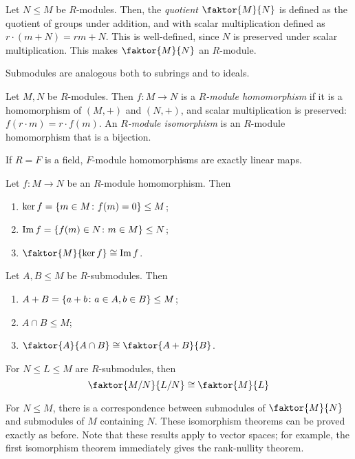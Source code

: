 \begin{definition}
	Let \( N \leq M \) be \( R \)-modules.
	Then, the \textit{quotient} \( \faktor{M}{N} \) is defined as the quotient of groups under addition, and with scalar multiplication defined as \( r \cdot (m + N) = rm + N \).
	This is well-defined, since \( N \) is preserved under scalar multiplication.
	This makes \( \faktor{M}{N} \) an \( R \)-module.
\end{definition}
\begin{remark}
	Submodules are analogous both to subrings and to ideals.
\end{remark}
\begin{definition}
	Let \( M, N \) be \( R \)-modules.
	Then \( f \colon M \to N \) is a \textit{\( R \)-module homomorphism} if it is a homomorphism of \( (M, +) \) and \( (N, +) \), and scalar multiplication is preserved: \( f(r \cdot m) = r \cdot f(m) \).
	An \textit{\( R \)-module isomorphism} is an \( R \)-module homomorphism that is a bijection.
\end{definition}
\begin{example}
	If \( R = F \) is a field, \( F \)-module homomorphisms are exactly linear maps.
\end{example}
\begin{theorem}
	Let \( f \colon M \to N \) be an \( R \)-module homomorphism.
	Then
	\begin{enumerate}
		\item \( \ker f = \qty{m \in M \colon f(m) = 0} \leq M \);
		\item \( \Im f = \qty{f(m) \in N \colon m \in M} \leq N \);
		\item \( \faktor{M}{\ker f} \cong \Im f \).
	\end{enumerate}
\end{theorem}
\begin{theorem}
	Let \( A, B \leq M \) be \( R \)-submodules.
	Then
	\begin{enumerate}
		\item \( A + B = \qty{a + b \colon a \in A, b \in B} \leq M \);
		\item \( A \cap B \leq M \);
		\item \( \faktor{A}{A \cap B} \cong \faktor{A + B}{B} \).
	\end{enumerate}
\end{theorem}
\begin{theorem}
	For \( N \leq L \leq M \) are \( R \)-submodules, then
	\[
		\faktor{M/N}{L/N} \cong \faktor{M}{L}
	\]
\end{theorem}
For \( N \leq M \), there is a correspondence between submodules of \( \faktor{M}{N} \) and submodules of \( M \) containing \( N \).
These isomorphism theorems can be proved exactly as before.
Note that these results apply to vector spaces; for example, the first isomorphism theorem immediately gives the rank-nullity theorem.


